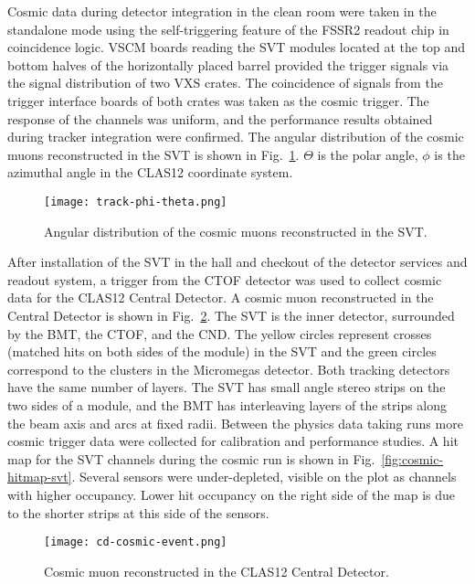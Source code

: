 Cosmic data during detector integration in the clean room were taken in the standalone mode using the self-triggering feature of the FSSR2 readout chip in coincidence logic. VSCM boards reading the SVT modules located at the top and bottom halves of the horizontally placed barrel provided the trigger signals via the signal distribution of two VXS crates. The coincidence of  signals from the trigger interface boards of both crates was taken as the cosmic trigger. The response of the channels was uniform, and the performance results obtained during tracker integration were confirmed. The angular distribution of the cosmic muons reconstructed in the SVT is shown in Fig.~\ref{fig:track-phi-theta}. $\Theta$ is the polar angle, $\phi$ is the azimuthal angle in the CLAS12 coordinate system.

\begin{figure}[hbt] 
\centering 
\texttt{[image: track-phi-theta.png]}
\caption{Angular distribution of the cosmic muons reconstructed in the SVT.}
\label{fig:track-phi-theta}
\end{figure}

After installation of the SVT in the hall and checkout of the detector services and readout system, a trigger from the CTOF detector was used to collect cosmic data for the CLAS12 Central Detector. A cosmic muon reconstructed in the Central Detector is shown in Fig.~\ref{fig:cd-cosmic-event}. The SVT is the inner detector, surrounded by the BMT, the CTOF, and the CND. The yellow circles represent crosses (matched hits on both sides of the module) in the SVT and the green circles correspond to the clusters in the Micromegas detector. Both tracking detectors have the same number of layers. The SVT has small angle stereo strips on the two sides of a module, and the BMT has interleaving layers of the strips along the beam axis and arcs at fixed radii. Between the physics data taking runs more cosmic trigger data were collected for calibration and performance studies.  A hit map for the SVT channels during the cosmic run is shown in Fig.~\ref{fig:cosmic-hitmap-svt}. Several sensors were under-depleted, visible on the plot as channels with higher occupancy. Lower hit occupancy on the right side of the map is due to the shorter strips at this side of the sensors. 

\begin{figure}[hbt] 
\centering 
\texttt{[image: cd-cosmic-event.png]}
\caption{Cosmic muon reconstructed in the CLAS12 Central Detector.}
\label{fig:cd-cosmic-event}
\end{figure}

